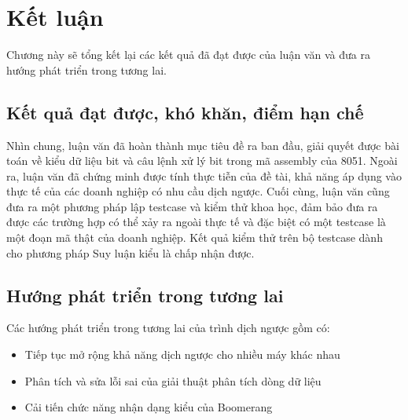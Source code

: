 \section{Kết luận}

Chương này sẽ tổng kết lại các kết quả đã đạt được của luận văn và đưa ra hướng phát triển trong tương lai.

\subsection{Kết quả đạt được, khó khăn, điểm hạn chế}

Nhìn chung, luận văn đã hoàn thành mục tiêu đề ra ban đầu, giải quyết được bài toán về kiểu dữ liệu bit và câu lệnh xử lý bit trong mã assembly của 8051. Ngoài ra, luận văn đã chứng minh được tính thực tiễn của đề tài, khả năng áp dụng vào thực tế của các doanh nghiệp có nhu cầu dịch ngược. Cuối cùng, luận văn cũng đưa ra một phương pháp lập testcase và kiểm thử khoa học, đảm bảo đưa ra được các trường hợp có thể xảy ra ngoài thực tế và đặc biệt có một testcase là một đoạn mã thật của doanh nghiệp. Kết quả kiểm thử trên bộ testcase dành cho phương pháp Suy luận kiểu là chấp nhận được.

\subsection{Hướng phát triển trong tương lai}

Các hướng phát triển trong tương lai của trình dịch ngược gồm có:

\begin{itemize}
	\item Tiếp tục mở rộng khả năng dịch ngược cho nhiều máy khác nhau
	\item Phân tích và sửa lỗi sai của giải thuật phân tích dòng dữ liệu
	\item Cải tiến chức năng nhận dạng kiểu của Boomerang
\end{itemize}
